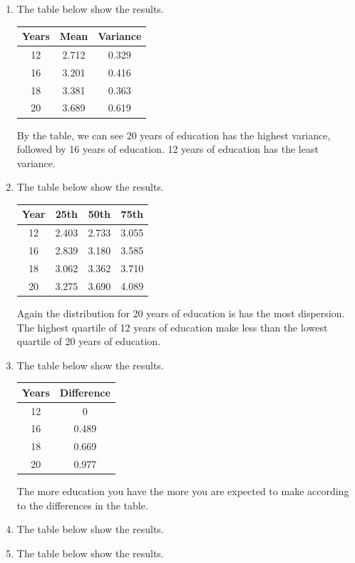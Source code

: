 \documentclass{article}
\begin{document}
\begin{enumerate}[label=\alph*)]
\item The table below show the results.

\begin{tabular}{ c c c }
 Years & Mean & Variance \\
 \hline
 12 & 2.712 & 0.329 \\ 
 16 & 3.201 & 0.416 \\ 
 18 & 3.381 & 0.363 \\ 
 20 & 3.689 & 0.619    
\end{tabular}

By the table, we can see 20 years of education has the highest variance, followed by 16 years of education. 12 years of education has the least variance.


\item The table below show the results.

\begin{tabular}{ c c c c }
Year & 25th & 50th & 75th \\
\hline
12 & 2.403 & 2.733 & 3.055 \\
16 & 2.839 &	3.180 & 3.585 \\
18 & 3.062 &	3.362 & 3.710 \\
20 & 3.275 &	3.690 &	4.089 \\
\end{tabular}

Again the distribution for 20 years of education is has the most dispersion. The highest quartile of 12 years of education make less than the lowest quartile of 20 years of education.

\item The table below show the results.

\begin{tabular}{ c c }
Years & Difference \\
\hline
12 & 0 \\
16 & 0.489 \\
18 & 0.669 \\
20 & 0.977 \\
\end{tabular}

The more education you have the more you are expected to make according to the differences in the table.

\item  The table below show the results.



\item The table below show the results.


\end{enumerate}
\end{document}

